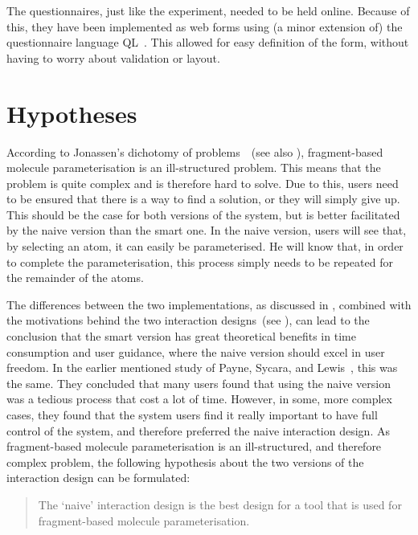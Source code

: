 The questionnaires, just like the experiment, needed to be held online. Because of this, they have been implemented as web forms using (a minor extension of) the questionnaire language QL~\cite{erdweg2013state}. This allowed for easy definition of the form, without having to worry about validation or layout.



\section{Hypotheses}
According to Jonassen's dichotomy of problems~\cite{jonassen2000toward}~(see also ), fragment-based molecule parameterisation is an ill-structured problem. This means that the problem is quite complex and is therefore hard to solve. Due to this, users need to be ensured that there is a way to find a solution, or they will simply give up. This should be the case for both versions of the system, but is better facilitated by the naive version than the smart one. In the naive version, users will see that, by selecting an atom, it can easily be parameterised. He will know that, in order to complete the parameterisation, this process simply needs to be repeated for the remainder of the atoms.

The differences between the two implementations, as discussed in , combined with the motivations behind the two interaction designs~(see ), can lead to the conclusion that the smart version has great theoretical benefits in time consumption and user guidance, where the naive version should excel in user freedom. In the earlier mentioned study of Payne, Sycara, and Lewis~\cite{payne2000varying}, this was the same. They concluded that many users found that using the naive version was a tedious process that cost a lot of time. However, in some, more complex cases, they found that the system users find it really important to have full control of the system, and therefore preferred the naive interaction design. As fragment-based molecule parameterisation is an ill-structured, and therefore complex problem, the following hypothesis about the two versions of the interaction design can be formulated:
\begin{quote}
The `naive' interaction design is the best design for a tool that is used for fragment-based molecule parameterisation.
\end{quote}

